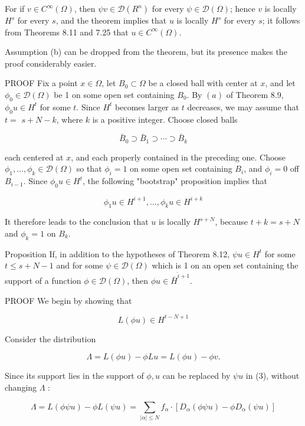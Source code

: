 \documentclass[10pt]{article}
\begin{document}
For if $v \in C^{\infty}(\Omega)$, then $\psi v \in \mathscr{D}\left(R^{n}\right)$ for every $\psi \in \mathscr{D}(\Omega)$; hence $v$ is locally $H^{s}$ for every $s$, and the theorem implies that $u$ is locally $H^{s}$ for every $s$; it follows from Theorems 8.11 and 7.25 that $u \in C^{\infty}(\Omega)$.

Assumption (b) can be dropped from the theorem, but its presence makes the proof considerably easier.

PROOF Fix a point $x \in \Omega$, let $B_{0} \subset \Omega$ be a closed ball with center at $x$, and let $\phi_{0} \in \mathscr{D}(\Omega)$ be 1 on some open set containing $B_{0}$. By $(a)$ of Theorem 8.9, $\phi_{0} u \in H^{t}$ for some $t$. Since $H^{t}$ becomes larger as $t$ decreases, we may assume that $t=$ $s+N-k$, where $k$ is a positive integer. Choose closed balls

$$
\bar{B}_{0} \supset \bar{B}_{1} \supset \cdots \supset \bar{B}_{k}
$$

each centered at $x$, and each properly contained in the preceding one. Choose $\phi_{1}, \ldots, \phi_{k} \in \mathscr{D}(\Omega)$ so that $\phi_{i}=1$ on some open set containing $B_{i}$, and $\phi_{i}=0$ off $B_{i-1}$. Since $\phi_{0} u \in H^{t}$, the following "bootstrap" proposition implies that

$$
\phi_{1} u \in H^{i+1}, \ldots, \phi_{k} u \in H^{i+k}
$$

It therefore leads to the conclusion that $u$ is locally $H^{s+N}$, because $t+k=s+N$ and $\phi_{k}=1$ on $B_{k}$.

Proposition If, in addition to the hypotheses of Theorem 8.12, $\psi u \in H^{t}$ for some $t \leq s+N-1$ and for some $\psi \in \mathscr{D}(\Omega)$ which is 1 on an open set containing the support of a function $\phi \in \mathscr{\mathscr { D }}(\Omega)$, then $\phi u \in \bar{H}^{\hat{i}+1}$.

PROOF We begin by showing that

$$
L(\phi u) \in H^{t-N+1}
$$

Consider the distribution

$$
\Lambda=L(\phi u)-\phi L u=L(\phi u)-\phi v .
$$

Since its support lies in the support of $\phi, u$ can be replaced by $\psi u$ in (3), without changing $\Lambda$ :

$$
\Lambda=L(\phi \psi u)-\phi L(\psi u)=\sum_{|\alpha| \leq N} f_{\alpha} \cdot\left[D_{\alpha}(\phi \psi u)-\phi D_{\alpha}(\psi u)\right]
$$
\end{document}
